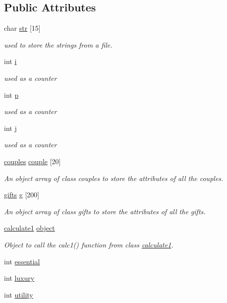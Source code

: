 \subsection*{Public Attributes}
\begin{DoxyCompactItemize}
\item 
char \hyperlink{classinputcouples_a7610a707dd089c210f966fe9b2945deb}{str} \mbox{[}15\mbox{]}
\begin{DoxyCompactList}\small\item\em used to store the strings from a file. \end{DoxyCompactList}\item 
int \hyperlink{classinputcouples_a37d4b84f90a165909017702a679806b0}{i}
\begin{DoxyCompactList}\small\item\em used as a counter \end{DoxyCompactList}\item 
int \hyperlink{classinputcouples_a095ea8a7e9628d304a22edaf37c016dd}{p}
\begin{DoxyCompactList}\small\item\em used as a counter \end{DoxyCompactList}\item 
int \hyperlink{classinputcouples_aaad2a14fc62c100f5a96e20259733949}{j}
\begin{DoxyCompactList}\small\item\em used as a counter \end{DoxyCompactList}\item 
\hyperlink{classcouples}{couples} \hyperlink{classinputcouples_abdb5a89072c488143be3a095d366169d}{couple} \mbox{[}20\mbox{]}
\begin{DoxyCompactList}\small\item\em An object array of class couples to store the attributes of all the couples. \end{DoxyCompactList}\item 
\hyperlink{classgifts}{gifts} \hyperlink{classinputcouples_a0182133c0b2ccb9c2fb4718765fa58ee}{g} \mbox{[}200\mbox{]}
\begin{DoxyCompactList}\small\item\em An object array of class gifts to store the attributes of all the gifts. \end{DoxyCompactList}\item 
\hyperlink{classcalculate1}{calculate1} \hyperlink{classinputcouples_a801870812607dfc59b61a16b36fe17ac}{object}
\begin{DoxyCompactList}\small\item\em Object to call the calc1() function from class \hyperlink{classcalculate1}{calculate1}. \end{DoxyCompactList}\item 
int \hyperlink{classinputcouples_a982ac9808534907ca98acf74a073283d}{essential}
\item 
int \hyperlink{classinputcouples_a6f9e3f541571e3183e95f91e9c53d076}{luxury}
\item 
int \hyperlink{classinputcouples_afe3651c7f5a5fca01b28e03fa0b46ae2}{utility}
\end{DoxyCompactItemize}



